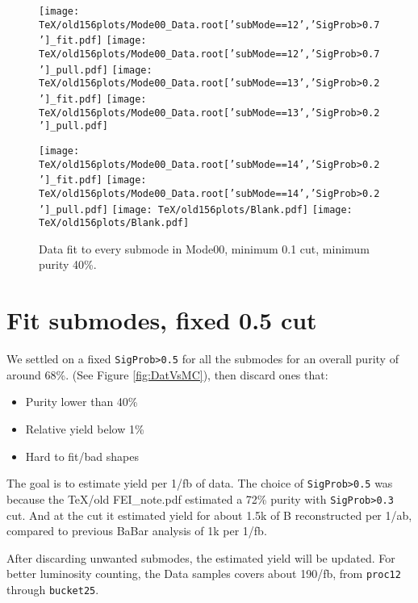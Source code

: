 \documentclass{article}
\begin{document}
\begin{figure}[p!]
\begin{center}
\texttt{[image: TeX/old156plots/Mode00\_Data.root['subMode==12','SigProb>0.7']\_fit.pdf]}
\texttt{[image: TeX/old156plots/Mode00\_Data.root['subMode==12','SigProb>0.7']\_pull.pdf]}
\texttt{[image: TeX/old156plots/Mode00\_Data.root['subMode==13','SigProb>0.2']\_fit.pdf]}
\texttt{[image: TeX/old156plots/Mode00\_Data.root['subMode==13','SigProb>0.2']\_pull.pdf]}

\texttt{[image: TeX/old156plots/Mode00\_Data.root['subMode==14','SigProb>0.2']\_fit.pdf]}
\texttt{[image: TeX/old156plots/Mode00\_Data.root['subMode==14','SigProb>0.2']\_pull.pdf]}
\texttt{[image: TeX/old156plots/Blank.pdf]}
\texttt{[image: TeX/old156plots/Blank.pdf]}
\caption{Data fit to every submode in Mode00, minimum 0.1 cut, minimum purity 40\%.} 
\label{fig:fitPlotsVarCut}
\end{center}
\end{figure}

\newpage
\section{Fit submodes, fixed 0.5 cut}
We settled on a fixed \verb+SigProb>0.5+ for all the submodes for an overall purity of around 68\%. 
(See Figure \ref{fig:DatVsMC}), then discard ones that:
\begin{itemize}
\item Purity lower than 40\%
\item Relative yield below 1\%
\item Hard to fit/bad shapes
\end{itemize}

The goal is to estimate yield per 1/fb of data.
The choice of \verb+SigProb>0.5+ was because the TeX/old FEI\_note.pdf estimated a 72\% purity with \verb+SigProb>0.3+ cut.
And at the cut it estimated yield for about 1.5k of B reconstructed per 1/ab, compared to previous BaBar analysis of 1k per 1/fb.

After discarding unwanted submodes, the estimated yield will be updated.
For better luminosity counting, the Data samples covers about 190/fb, from \verb+proc12+ through \verb+bucket25+.
\end{document}
